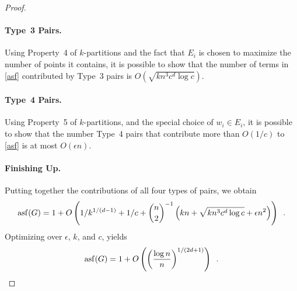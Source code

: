 \documentclass{patmorin}
\DeclareMathOperator{\asf}{asf}
\begin{document}
\begin{proof}
  \paragraph{Type~3 Pairs.} Using Property~4 of $k$-partitions and the
  fact that $E_i$ is chosen to maximize the number of points it contains,
  it is possible to show that the number of terms in \eqref{asf} contributed
  by Type~3 pairs is $O\left(\sqrt{kn^3c^d\log c}\right)$.

  \paragraph{Type~4 Pairs.}  Using Property~5 of $k$-partitions, and
  the special choice of $w_i\in E_i$, it is possible to show that the number
  Type~4 pairs that contribute more than $O(1/c)$ to \eqref{asf} is at most
  $O(\epsilon n)$.

  \paragraph{Finishing Up.}
  Putting together the contributions of all four types of pairs, we obtain
  \begin{equation}\eqlabel{master-asf}
     \asf(G) = 1 + O\left(1/k^{1/(d-1)} + 1/c 
       + \binom{n}{2}^{-1}\left(kn+\sqrt{kn^{3}c^{d}\log c}
             +\epsilon n^2\right)\right) \enspace .
  \end{equation}
  Optimizing over $\epsilon$, $k$, and $c$, yields
  \[
     \asf(G) = 1+ O\left(\left(\frac{\log n}{n}\right)^{1/(2d+1)}\right) \enspace . \qedhere
  \]
\end{proof}

%
\end{document}
